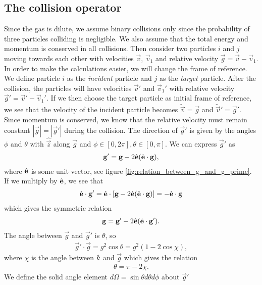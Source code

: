 \subsection{The collision operator}
Since the gas is dilute, we assume binary collisions only since the probability of three particles colliding is negligible. We also assume that the total energy and momentum is conserved in all collisions. Then consider two particles $i$ and $j$ moving towards each other with velocities $\vec v$, $\vec v_1$ and relative velocity $\vec g = \vec v - \vec v_1$. In order to make the calculations easier, we will change the frame of reference. We define particle $i$ as the \textit{incident} particle and $j$ as the \textit{target} particle. After the collision, the particles will have velocities $\vec v'$ and $\vec v_1'$ with relative velocity $\vec g' = \vec v' - \vec v_1'$. If we then choose the target particle as initial frame of reference, we see that the velocity of the incident particle becomes $\tilde {\vec v} = \vec g$ and $\tilde {\vec v}' = \vec g'$. Since momentum is conserved, we know that the relative velocity must remain constant $|\vec g| = |\vec g'|$ during the collision. The direction of $\vec g'$ is given by the angles $\phi$ and $\theta$ with $\hat {\vec z}$ along $\vec g$ and $\phi \in [0, 2\pi], \theta \in [0, \pi]$. We can express $\vec g'$ as
\begin{align}
	\mathbf g' = \mathbf g - 2\hat {\mathbf{e}}(\hat {\mathbf{e}}\cdot\mathbf g),
\end{align}
where $\hat {\mathbf{e}}$ is some unit vector, see figure \ref{fig:relation_between_g_and_g_prime}. If we multiply by $\hat {\mathbf{e}}$, we see that 
\begin{align}
	\hat {\mathbf{e}}\cdot \mathbf g' = \hat {\mathbf{e}}\cdot\left[\mathbf g - 2\hat {\mathbf{e}}(\hat {\mathbf{e}}\cdot\mathbf g)\right] = -\hat {\mathbf{e}} \cdot \mathbf g
\end{align}
which gives the symmetric relation
\begin{align}
	\mathbf g = \mathbf g' - 2\hat {\mathbf{e}}(\hat {\mathbf{e}}\cdot\mathbf g').
\end{align}
The angle between $\vec g$ and $\vec g'$ is $\theta$, so
\begin{align}
	\vec g'\cdot \vec g = g^2\cos\theta = g^2(1 - 2\cos \chi),
\end{align}
where $\chi$ is the angle between $\hat {\mathbf{e}}$ and $\vec g$ which gives the relation
\begin{align}
	\theta = \pi - 2\chi.
\end{align}
We define the solid angle element $d\Omega=\sin\theta d\theta d\phi$ about $\vec g'$ 
